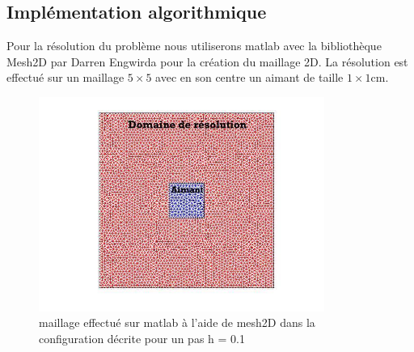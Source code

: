 \documentclass[a4paper,12pt,titlepage]{report}
\begin{document}
\begin{onehalfspace}
\subsection{Implémentation algorithmique}

Pour la résolution du problème nous utiliserons matlab avec la bibliothèque Mesh2D par Darren Engwirda pour la création du maillage 2D.
La résolution est effectué sur un maillage $5\times 5$ avec en son centre un aimant de taille $1\times 1$cm.

\begin{figure}[h]
	\begin{center}
	\includegraphics[height = 7cm, keepaspectratio]{graphes/maillage_resolution_champ_magnetique.jpg} 
	\caption{\label{figure 3 } maillage effectué sur matlab à l'aide de mesh2D dans la configuration décrite pour un pas h = 0.1}
	\end{center}
\end{figure}


\end{onehalfspace}
\end{document}

